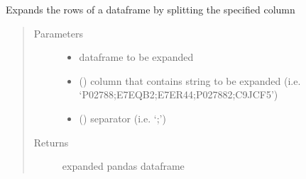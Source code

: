 \documentclass[letterpaper,10pt,english]{sphinxmanual}
\begin{document}
\begin{fulllineitems}
\label{\detokenize{_autosummary/graphdb_builder:graphdb_builder.builder_utils.expand_cols}}
Expands the rows of a dataframe by splitting the specified column
\begin{quote}\begin{description}
\item[{Parameters}] \leavevmode\begin{itemize}
\item {} 
 \textendash{} dataframe to be expanded

\item {} 
 () \textendash{} column that contains string to be expanded (i.e. ‘P02788;E7EQB2;E7ER44;P02788\sphinxhyphen{}2;C9JCF5’)

\item {} 
 () \textendash{} separator (i.e. ‘;’)

\end{itemize}

\item[{Returns}] \leavevmode
expanded pandas dataframe

\end{description}\end{quote}

\end{fulllineitems}

\end{document}

